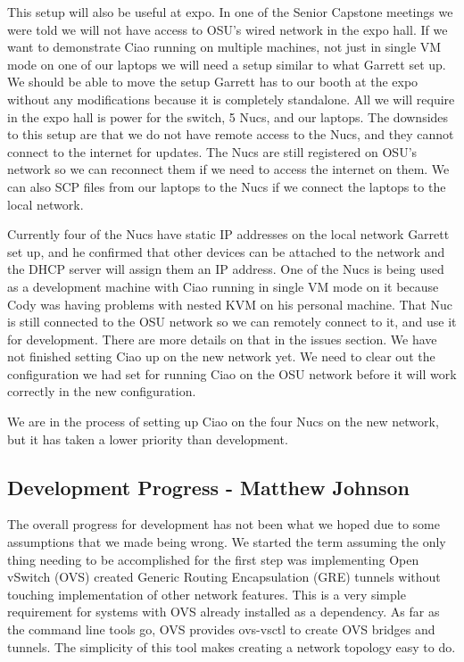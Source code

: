 \documentclass[10pt,onecolumn,journal,draftclsnofoot]{IEEEtran}
\begin{document}
This setup will also be useful at expo.
In one of the Senior Capstone meetings we were told  we will not have access to
OSU's wired network in the expo hall. If we want
to demonstrate Ciao running on multiple machines, not just in single VM mode on
one of our laptops we will need a setup similar to what Garrett set up.
We should be able to move the setup Garrett has to our booth at the expo
without any modifications because it is completely standalone. All we will
require in the expo hall is power for the switch, 5 Nucs, and our laptops.
The downsides to this setup are that we do not have remote access to the Nucs,
and they cannot connect to the internet for updates. The Nucs are still
registered on OSU's network so we can reconnect them if we need to access the
internet on them. We can also SCP files from our laptops to the Nucs if we
connect the laptops to the local network.

Currently four of the Nucs have static IP addresses on the local network Garrett
set up, and he confirmed that other devices can be attached to the network and
the DHCP server will assign them an IP address. One of the Nucs is being used 
as a development machine with Ciao running in single VM mode on it because Cody
was having problems with nested KVM on his personal machine. That Nuc is still 
connected to the OSU network so we can remotely connect to it, and use it for 
development.
There are more details on that in the issues section.
We have not finished setting Ciao up on the new network yet. We need to
clear out the configuration we had set for running Ciao on the OSU network
before it will work correctly in the new configuration.

We are in the process of setting up Ciao on the four Nucs on the  new network,
but it has taken a lower priority than development.

\subsection{Development Progress - Matthew Johnson}
The overall progress for development has not been what we hoped due to some
assumptions that we made being wrong. We started the term assuming the only
thing needing to be accomplished for the first step was implementing Open
vSwitch (OVS) created Generic Routing Encapsulation (GRE) tunnels without
touching implementation of other network features. This is a very simple
requirement for systems with OVS already installed as a dependency. As far as
the command line tools go, OVS provides ovs-vsctl to create OVS bridges and
tunnels. The simplicity of this tool makes creating a network topology easy to
do.
\end{document}
